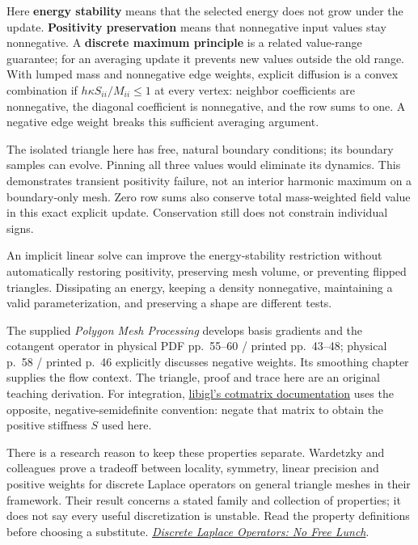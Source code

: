 Here \textbf{energy stability} means that the selected energy does not grow under the update. \textbf{Positivity preservation} means that nonnegative input values stay nonnegative. A \textbf{discrete maximum principle} is a related value-range guarantee; for an averaging update it prevents new values outside the old range. With lumped mass and nonnegative edge weights, explicit diffusion is a convex combination if \(h\kappa S_{ii}/M_{ii}\leq1\) at every vertex: neighbor coefficients are nonnegative, the diagonal coefficient is nonnegative, and the row sums to one. A negative edge weight breaks this sufficient averaging argument.

The isolated triangle here has free, natural boundary conditions; its boundary samples can evolve. Pinning all three values would eliminate its dynamics. This demonstrates transient positivity failure, not an interior harmonic maximum on a boundary-only mesh. Zero row sums also conserve total mass-weighted field value in this exact explicit update. Conservation still does not constrain individual signs.

An implicit linear solve can improve the energy-stability restriction without automatically restoring positivity, preserving mesh volume, or preventing flipped triangles. Dissipating an energy, keeping a density nonnegative, maintaining a valid parameterization, and preserving a shape are different tests.

The supplied \emph{Polygon Mesh Processing} develops basis gradients and the cotangent operator in physical PDF pp.~55--60 / printed pp.~43--48; physical p.~58 / printed p.~46 explicitly discusses negative weights. Its smoothing chapter supplies the flow context. The triangle, proof and trace here are an original teaching derivation. For integration, \href{https://github.com/libigl/libigl/blob/main/include/igl/cotmatrix.h}{libigl's cotmatrix documentation} uses the opposite, negative-semidefinite convention: negate that matrix to obtain the positive stiffness \(S\) used here.

There is a research reason to keep these properties separate. Wardetzky and colleagues prove a tradeoff between locality, symmetry, linear precision and positive weights for discrete Laplace operators on general triangle meshes in their framework. Their result concerns a stated family and collection of properties; it does not say every useful discretization is unstable. Read the property definitions before choosing a substitute. \href{https://www.cs.columbia.edu/cg/pdfs/1180993110-laplacian.pdf}{\emph{Discrete Laplace Operators: No Free Lunch}}.

